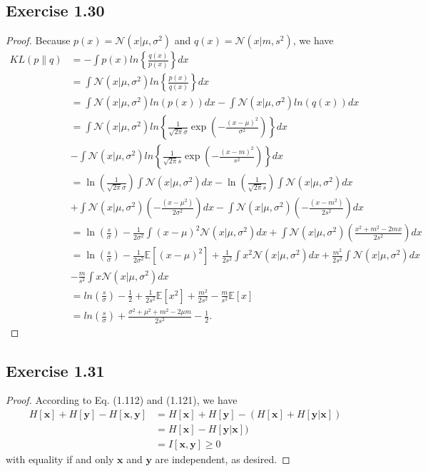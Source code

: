 \documentclass[11pt]{article}
\theoremstyle{definition}
\newcommand{\E}{\mathbb{E}}
\begin{document}
\subsection{Exercise 1.30}
\begin{proof}
Because $p(x) = \mathcal{N}(x|\mu,\sigma^2)$ and $q(x) = \mathcal{N}(x|m,s^2)$, we have
\begin{align*}
KL(p\lVert q) &= -\int p(x)ln\left\{\frac{q(x)}{p(x)}\right\}dx \\
&= \int \mathcal{N}(x|\mu,\sigma^2)ln\left\{\frac{p(x)}{q(x)}\right\}dx \\
&= \int \mathcal{N}(x|\mu,\sigma^2)ln(p(x))dx - \int \mathcal{N}(x|\mu,\sigma^2)ln(q(x))dx \\
&= \int \mathcal{N}(x|\mu,\sigma^2)ln\left\{\frac{1}{\sqrt{2\pi}\sigma}\exp\left(-\frac{(x-\mu)^2}{\sigma^2}\right)\right\}dx \\
& - \int \mathcal{N}(x|\mu,\sigma^2)ln\left\{\frac{1}{\sqrt{2\pi}s}\exp\left(-\frac{(x-m)^2}{s^2}\right)\right\}dx\\
&= \ln\left(\frac{1}{\sqrt{2\pi}\sigma}\right)\int \mathcal{N}(x|\mu,\sigma^2)dx - \ln\left(\frac{1}{\sqrt{2\pi}s}\right)\int \mathcal{N}(x|\mu,\sigma^2)dx \\
&+ \int \mathcal{N}(x|\mu,\sigma^2)\left(-\frac{(x-\mu^2)}{2\sigma^2}\right)dx - \int \mathcal{N}(x|\mu,\sigma^2)\left(-\frac{(x-m^2)}{2s^2}\right)dx \\
&= \ln\left(\frac{s}{\sigma}\right) - \frac{1}{2\sigma^2}\int(x-\mu)^2\mathcal{N}(x|\mu,\sigma^2)dx + \int \mathcal{N}(x|\mu,\sigma^2)\left(\frac{x^2 + m^2 - 2mx}{2s^2}\right)dx \\
&= \ln\left(\frac{s}{\sigma}\right) - \frac{1}{2\sigma^2}\E[(x-\mu)^2] + \frac{1}{2s^2}\int x^2\mathcal{N}(x|\mu,\sigma^2)dx + \frac{m^2}{2s^2}\int\mathcal{N}(x|\mu,\sigma^2)dx\\
&- \frac{m}{s^2}\int x\mathcal{N}(x|\mu,\sigma^2)dx \\
&= ln\left(\frac{s}{\sigma}\right) - \frac{1}{2} + \frac{1}{2s^2}\E[x^2] + \frac{m^2}{2s^2} - \frac{m}{s^2}\E[x] \\
&= ln\left(\frac{s}{\sigma}\right) + \frac{\sigma^2+\mu^2+m^2-2\mu m}{2s^2} -\frac{1}{2}.
\end{align*}
\end{proof}

\subsection{Exercise 1.31}
\begin{proof}
According to Eq. (1.112) and (1.121), we have
\begin{align*}
H[\textbf{x}] + H[\textbf{y}] - H[\textbf{x}, \textbf{y}] &= H[\textbf{x}] + H[\textbf{y}] - (H[\textbf{x}] + H[\textbf{y}|\textbf{x}]) \\
 &= H[\textbf{x}] - H[\textbf{y}|\textbf{x}]) \\
 &= I[\textbf{x}, \textbf{y}] \geq 0
\end{align*}
with equality if and only $\textbf{x}$ and $\textbf{y}$ are independent, as desired. 
\end{proof}
\end{document}
